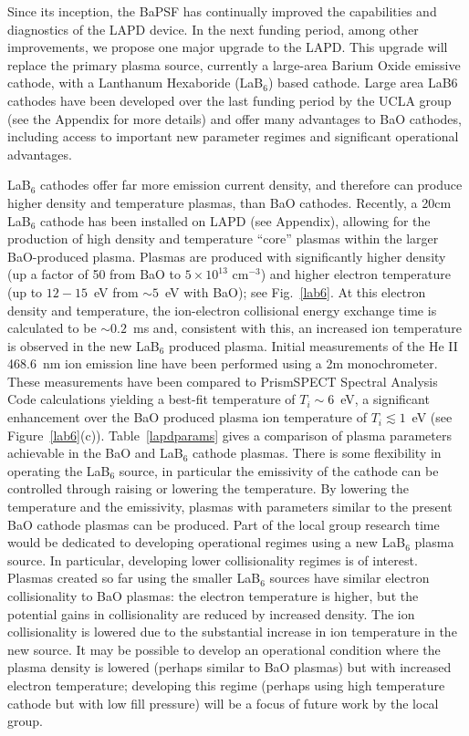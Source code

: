 \documentclass[11pt]{article}
\begin{document}
Since its inception, the BaPSF has continually improved the capabilities
and diagnostics of the LAPD device. In the next funding period, among
other improvements, we propose one major upgrade to the LAPD. This
upgrade will replace the primary plasma source, currently a large-area
Barium Oxide emissive cathode, with a Lanthanum Hexaboride (LaB$_6$) based
cathode. Large area LaB6 cathodes have been developed over the last
funding period by the UCLA group (see the Appendix for more details) and
offer many advantages to BaO cathodes, including access to important new
parameter regimes and significant operational advantages.

LaB$_6$ cathodes offer far more emission current density, and
therefore can produce higher density and temperature plasmas, than BaO cathodes.
Recently, a 20cm LaB$_6$ cathode has been installed on LAPD (see
Appendix), allowing for the production of high density and temperature
``core'' plasmas within the larger BaO-produced plasma. Plasmas are
produced with significantly higher density (up a factor of 50 from BaO
to $5\times 10^{13}$ cm$^{-3}$) and higher electron temperature (up to
$12-15$~eV from $\sim 5$~eV with BaO); see Fig.~\ref{lab6}. At this
electron density and temperature, the ion-electron collisional energy
exchange time is calculated to be $\sim 0.2$~ms and, consistent with
this, an increased ion temperature is observed in the new LaB$_6$
produced plasma. Initial measurements of the He II 468.6~nm
ion emission line have been performed using a 2m monochrometer. These
measurements have been compared to PrismSPECT Spectral Analysis Code
calculations yielding a best-fit temperature of $T_i \sim 6$~eV, a
significant enhancement over the BaO produced plasma ion temperature
of $T_i \lesssim 1$~eV (see Figure~\ref{lab6}(c)).
Table~\ref{lapdparams} gives a comparison of plasma parameters
achievable in the BaO and LaB$_6$ cathode plasmas.  There is some
flexibility in operating the LaB$_6$ source, in particular the
emissivity of the cathode can be controlled through raising or
lowering the temperature.  By lowering the temperature and the
emissivity, plasmas with parameters similar to the present BaO cathode plasmas can
be produced. Part of the local group research time would be dedicated
to developing operational regimes using a new LaB$_6$ plasma source. In
particular, developing lower collisionality regimes is of interest.
Plasmas created so far using the smaller LaB$_6$ sources have similar
electron collisionality to BaO plasmas: the electron temperature is
higher, but the potential gains in collisionality are reduced by increased
density.  The ion collisionality is lowered due to the substantial
increase in ion temperature in the new source.  It may be possible to
develop an operational condition where the plasma density is lowered
(perhaps similar to BaO plasmas) but with increased electron
temperature; developing this regime (perhaps using high temperature
cathode but with low fill pressure) will be a focus of future work by
the local group.  
\end{document}
